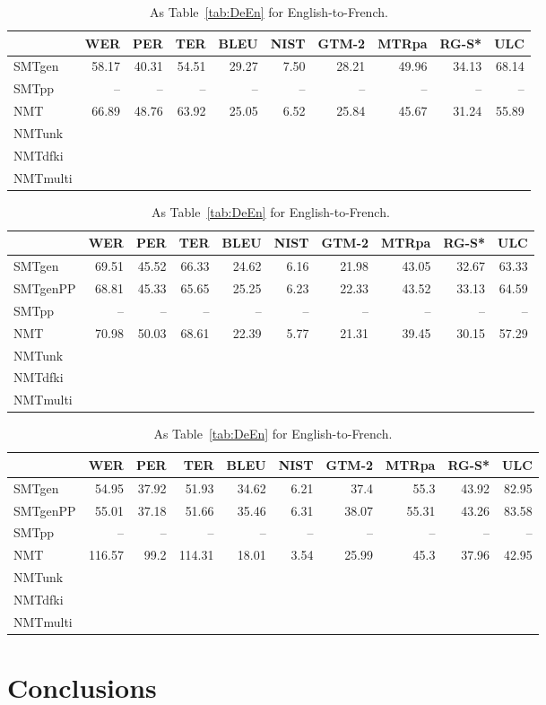 \documentclass[a4paper,11pt]{article}
\begin{document}
\begin{table}[t]
\small
{}
\begin{tabular}{lrrrrrrrrr}
\toprule
         & WER   &  PER  & TER   &  BLEU & NIST & GTM-2 & MTRpa & RG-S* & ULC \\
\midrule
SMTgen & 58.17 & 40.31 & 54.51 & 29.27 & 7.50 & 28.21 & 49.96 & 34.13 & 68.14 \\  
SMTpp    &   --  &   --  &   --  &   --  &  --  &   --  &   --  &   --  &   --  \\
NMT    & 66.89 & 48.76 & 63.92 & 25.05 & 6.52 & 25.84 & 45.67 & 31.24 & 55.89 \\  
NMTunk  \\
NMTdfki \\
NMTmulti \\
\bottomrule
\end{tabular}

\begin{tabular}{lrrrrrrrrr}
\toprule
         & WER   &  PER  & TER   &  BLEU & NIST & GTM-2 & MTRpa & RG-S* & ULC \\
\midrule
SMTgen	 & 69.51 & 45.52 & 66.33 & 24.62 & 6.16 & 21.98 & 43.05 & 32.67 & 63.33 \\  
SMTgenPP & 68.81 & 45.33 & 65.65 & 25.25 & 6.23 & 22.33 & 43.52 & 33.13 & 64.59 \\  
SMTpp    &   --  &   --  &   --  &   --  &  --  &   --  &   --  &   --  &   --  \\
NMT 	 & 70.98 & 50.03 & 68.61 & 22.39 & 5.77 & 21.31 & 39.45 & 30.15 & 57.29 \\  
NMTunk  \\
NMTdfki \\
NMTmulti \\
\bottomrule
\end{tabular}

\begin{tabular}{lrrrrrrrrr}
\toprule
         & WER   &  PER  & TER   &  BLEU & NIST & GTM-2 & MTRpa & RG-S* & ULC \\
\midrule
SMTgen	 & 54.95 & 37.92 & 51.93 & 34.62 & 6.21 & 37.4 & 55.3 & 43.92 & 82.95 \\  
SMTgenPP & 55.01 & 37.18 & 51.66 & 35.46 & 6.31 & 38.07 & 55.31 & 43.26 & 83.58 \\  
SMTpp    &   --  &   --  &   --  &   --  &  --  &   --  &   --  &   --  &   --  \\
NMT 	 & 116.57 & 99.2 & 114.31 & 18.01 & 3.54 & 25.99 & 45.3 & 37.96 & 42.95 \\  
NMTunk  \\
NMTdfki \\
NMTmulti \\
\bottomrule
\end{tabular}
 \caption{As Table~\ref{tab:DeEn} for English-to-French.}
 \label{tab:EnFr}
\end{table}



\section{Conclusions}
\label{s:conclusions}


%
%


\end{document}
